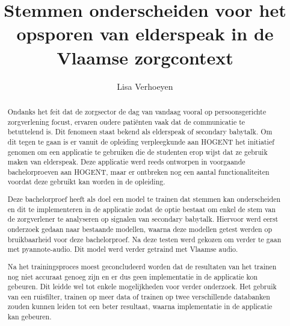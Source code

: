 \documentclass[a0,portrait]{hogent-poster}
\title{Stemmen onderscheiden voor het opsporen van elderspeak in de Vlaamse zorgcontext}
\author{Lisa Verhoeyen}
\begin{document}
\maketitle

\begin{abstract}
Ondanks het feit dat de zorgsector de dag van vandaag vooral op persoonsgerichte zorgverlening focust, ervaren oudere patiënten vaak dat de communicatie te betuttelend is. Dit fenomeen staat bekend als elderspeak of secondary babytalk. Om dit tegen te gaan is er vanuit de opleiding verpleegkunde aan HOGENT het initiatief genomen om een applicatie te gebruiken die de studenten erop wijst dat ze gebruik maken van elderspeak. Deze applicatie werd reeds ontworpen in voorgaande bachelorproeven aan HOGENT, maar er ontbreken nog een aantal functionaliteiten voordat deze gebruikt kan worden in de opleiding.

Deze bachelorproef heeft als doel een model te trainen dat stemmen kan onderscheiden en dit te implementeren in de applicatie zodat de optie bestaat om enkel de stem van de zorgverlener te analyseren op signalen van secondary babytalk. Hiervoor werd eerst onderzoek gedaan naar bestaande modellen, waarna deze modellen getest werden op bruikbaarheid voor deze bachelorproef. Na deze testen werd gekozen om verder te gaan met pyannote-audio. Dit model werd verder getraind met Vlaamse audio.

Na het trainingsproces moest geconcludeerd worden dat de resultaten van het trainen nog niet accuraat genoeg zijn en er dus geen implementatie in de applicatie kon gebeuren. Dit leidde wel tot enkele mogelijkheden voor verder onderzoek. Het gebruik van een ruisfilter, trainen op meer data of trainen op twee verschillende databanken zouden kunnen leiden tot een beter resultaat, waarna implementatie in de applicatie kan gebeuren.
\end{abstract}
\end{document}

